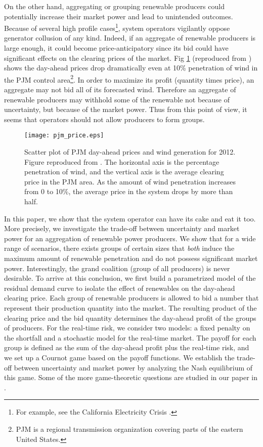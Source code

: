 \documentclass[journal]{IEEEtran}
\begin{document}
On the other hand, aggregating or grouping renewable producers could potentially increase their market power and lead to unintended outcomes. Because of several high profile cases\footnote{For example, see the California Electricity Crisis \cite{FERC}.}, system operators vigilantly oppose generator collusion of any kind. Indeed,  if an aggregate of renewable producers is large enough, it could become price-anticipatory since its bid could have significant effects on the clearing prices of the market. Fig \ref{fig:pjm} (reproduced from  \cite{Gil13}) shows the day-ahead prices drop dramatically even at 10\% penetration of wind in the PJM control area\footnote{PJM is a regional transmission organization covering parts of the eastern United States.}. In order to maximize its profit (quantity times price), an aggregate may not bid all of its forecasted wind. Therefore an aggregate of renewable producers may withhold some of the renewable not because of uncertainty, but because of the market power. Thus from this point of view, it seems that operators should not allow producers to form groups. 
	\begin{figure}[ht]
	\centering
	\texttt{[image: pjm\_price.eps]}
	\caption{Scatter plot of PJM day-ahead prices and wind generation for 2012. Figure reproduced from \cite{Gil13}. The horizontal axis is the percentage penetration of wind, and the vertical axis is the average clearing price in the PJM area. As the amount of wind penetration increases from 0 to 10\%, the average price in the system drops by more than half.} 
	\label{fig:pjm}
	\end{figure}
	
In this paper, we show that the system operator can have its cake and eat it too. More precisely, we investigate the trade-off between uncertainty and market power for an aggregation of renewable power producers. We show that for a wide range of scenarios, there exists groups of certain sizes that \emph{both} induce the maximum amount of renewable penetration and do not possess significant market power. Interestingly, the grand coalition (group of all producers) is never desirable.  To arrive at this conclusion, we first build a parametrized model of the residual demand curve to isolate the effect of renewables on the day-ahead clearing price. Each group of renewable producers is allowed to bid a number that represent their production quantity into the market. The resulting product of the clearing price and the bid quantity determines the day-ahead profit of the groups of producers. For the real-time risk, we consider two models: a fixed penalty on the shortfall and a stochastic model for the real-time market. The payoff for each group is defined as the sum of the day-ahead profit plus the real-time risk, and we set up a Cournot game based on the payoff functions. We establish the trade-off between uncertainty and market power by  analyzing the Nash equilibrium of this game. Some of the more game-theoretic questions are studied in our paper in \cite{Zhang14}. 
\end{document}
